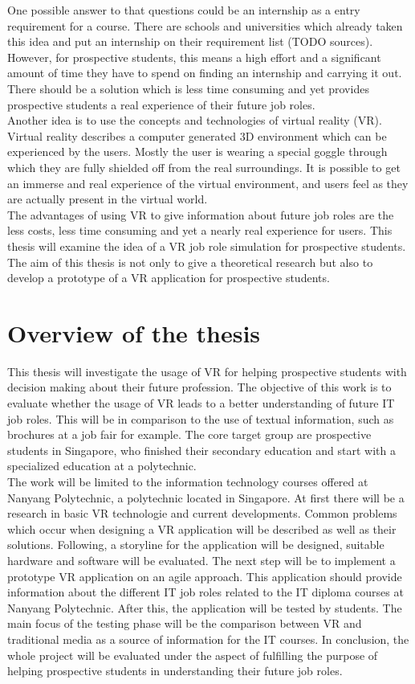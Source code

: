 One possible answer to that questions could be an internship as a entry requirement for a course. There are schools and universities which already taken this idea and put an internship on their requirement list (TODO sources). However, for prospective students, this means a high effort and a significant amount of time they have to spend on finding an internship and carrying it out. There should be a solution which is less time consuming and yet provides prospective students a real experience of their future job roles.\\
Another idea is to use the concepts and technologies of virtual reality (VR). Virtual reality describes a computer generated 3D environment which can be experienced by the users. Mostly the user is wearing a special goggle through which they are fully shielded off from the real surroundings. It is possible to get an immerse and real experience of the virtual environment, and users feel as they are actually present in the virtual world. \cite{Linowes.2015}\\
The advantages of using VR to give information about future job roles are the less costs, less time consuming and yet a nearly real experience for users. This thesis will examine the idea of a VR job role simulation for prospective students. The aim of this thesis is not only to give a theoretical research but also to develop a prototype of a VR application for prospective students. 

\section{Overview of the thesis}
This thesis will investigate the usage of VR for helping prospective students with decision making about their future profession. The objective of this work is to evaluate whether the usage of VR leads to a better understanding of future IT job roles. This will be in comparison to the use of textual information, such as brochures at a job fair for example. The core target group are prospective students in Singapore, who finished their secondary education and start with a specialized education at a polytechnic. \\
The work will be limited to the information technology courses offered at Nanyang Polytechnic, a polytechnic located in Singapore. At first there will be a  research in basic VR technologie and current developments. Common problems which occur when designing a VR application will be described as well as their solutions. Following, a storyline for the application will be designed, suitable hardware and software will be evaluated. The next step will be to implement a prototype VR application on an agile approach. This application should provide information about the different IT job roles related to the IT diploma courses at Nanyang Polytechnic. After this, the application will be tested by students. The main focus of the testing phase will be the comparison between VR and traditional media as a source of information for the IT courses. In conclusion, the whole project will be evaluated under the aspect of fulfilling the purpose of helping prospective students in understanding their future job roles.

